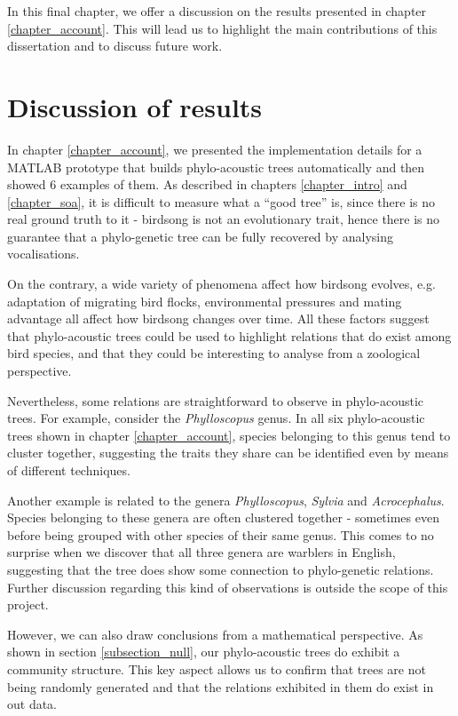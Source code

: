\documentclass[../main.tex]{subfiles}
\begin{document}
 \label{chapter_conclusion}
In this final chapter, we offer a discussion on the results presented in chapter \ref{chapter_account}. This will lead us to highlight the main contributions of this dissertation and to discuss future work.

\section{Discussion of results}
In chapter \ref{chapter_account}, we presented the implementation details for a MATLAB prototype that builds phylo-acoustic trees automatically and then showed 6 examples of them. As described in chapters \ref{chapter_intro} and \ref{chapter_soa}, it is difficult to measure what a ``good tree'' is, since there is no real ground truth to it - birdsong is not an evolutionary trait, hence there is no guarantee that a phylo-genetic tree can be fully recovered by analysing vocalisations. 
\par On the contrary, a wide variety of phenomena affect how birdsong evolves, e.g. adaptation of migrating bird flocks, environmental pressures and mating advantage all affect how birdsong changes over time. All these factors suggest that phylo-acoustic trees could be used to highlight relations that do exist among bird species, and that they could be interesting to analyse from a zoological perspective.
\par Nevertheless, some relations are straightforward to observe in phylo-acoustic trees. For example, consider the \emph{Phylloscopus} genus. In all six phylo-acoustic trees shown in chapter \ref{chapter_account}, species belonging to this genus tend to cluster together, suggesting the traits they share can be identified even by means of different techniques.
\par Another example is related to the genera \emph{Phylloscopus}, \emph{Sylvia} and \emph{Acrocephalus}. Species belonging to these genera are often clustered together - sometimes even before being grouped with other species of their same genus. This comes to no surprise when we discover that all three genera are warblers in English, suggesting that the tree does show some connection to phylo-genetic relations. Further discussion regarding this kind of observations is outside the scope of this project.
\par However, we can also draw conclusions from a mathematical perspective. As shown in section \ref{subsection_null}, our phylo-acoustic trees do exhibit a community structure. This key aspect allows us to confirm that trees are not being randomly generated and that the relations exhibited in them do exist in out data. 
\end{document}
